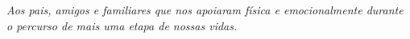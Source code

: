 \begin{dedicatoria}
   \vspace*{\fill}
   \centering
   \noindent
   \textit{ Aos pais, amigos e familiares que nos apoiaram física e emocionalmente durante o percurso de mais uma etapa de nossas vidas.} \vspace*{\fill}
\end{dedicatoria}
